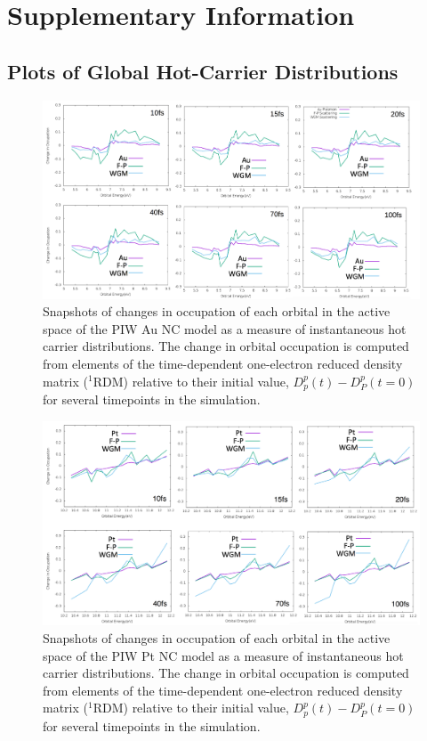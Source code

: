 \documentclass[journal=jpclcd,manuscript=article]{achemso}
\begin{document}
\newpage
\section{Supplementary Information}

\subsection{Plots of Global Hot-Carrier Distributions}

\begin{figure}
\begin{center}
\includegraphics[width=6in]{figs/Au_HotElectronDistribution_Comparison.png}
\caption{Snapshots of changes in occupation of each orbital in the active space of the PIW Au NC model as a measure of instantaneous hot carrier distributions.
The change in orbital occupation is computed from elements of the time-dependent one-electron reduced density matrix ($^1$RDM) relative to
their initial value, $D_p^p(t)-D_P^p(t=0)$ for several timepoints in the simulation.}
\end{center}
\end{figure}


\begin{figure}
\begin{center}
\includegraphics[width=6in]{figs/Pt_HotElectronDistribution_Comparison.png}
\caption{Snapshots of changes in occupation of each orbital in the active space of the PIW Pt NC model as a measure of instantaneous hot carrier distributions.
The change in orbital occupation is computed from elements of the time-dependent one-electron reduced density matrix ($^1$RDM) relative to
their initial value, $D_p^p(t)-D_P^p(t=0)$ for several timepoints in the simulation.  }
\end{center}
\end{figure}
\end{document}
